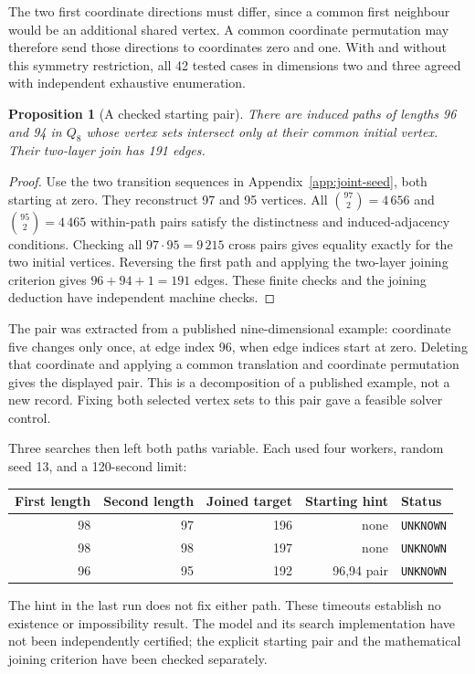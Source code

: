 \documentclass[11pt,a4paper]{article}
\newtheorem{proposition}[theorem]{Proposition}
\theoremstyle{definition}
\theoremstyle{remark}
\newcommand{\Q}{Q}
\begin{document}
The two first coordinate directions must differ, since a common first neighbour would be an additional shared vertex. A common coordinate permutation may therefore send those directions to coordinates zero and one. With and without this symmetry restriction, all 42 tested cases in dimensions two and three agreed with independent exhaustive enumeration.

\begin{proposition}[A checked starting pair]\label{prop:joint-seed}
There are induced paths of lengths 96 and 94 in $\Q_8$ whose vertex sets intersect only at their common initial vertex. Their two-layer join has 191 edges.
\end{proposition}
\begin{proof}
Use the two transition sequences in Appendix~\ref{app:joint-seed}, both starting at zero. They reconstruct 97 and 95 vertices. All $\binom{97}{2}=4\,656$ and $\binom{95}{2}=4\,465$ within-path pairs satisfy the distinctness and induced-adjacency conditions. Checking all $97\cdot95=9\,215$ cross pairs gives equality exactly for the two initial vertices. Reversing the first path and applying the two-layer joining criterion gives $96+94+1=191$ edges. These finite checks and the joining deduction have independent machine checks.
\end{proof}

The pair was extracted from a published nine-dimensional example: coordinate five changes only once, at edge index 96, when edge indices start at zero. Deleting that coordinate and applying a common translation and coordinate permutation gives the displayed pair. This is a decomposition of a published example, not a new record. Fixing both selected vertex sets to this pair gave a feasible solver control.

Three searches then left both paths variable. Each used four workers, random seed 13, and a 120-second limit:
\begin{center}
\begin{tabular}{rrrrl}
\toprule
First length & Second length & Joined target & Starting hint & Status\\
\midrule
98 & 97 & 196 & none & \texttt{UNKNOWN}\\
98 & 98 & 197 & none & \texttt{UNKNOWN}\\
96 & 95 & 192 & 96,94 pair & \texttt{UNKNOWN}\\
\bottomrule
\end{tabular}
\end{center}
The hint in the last run does not fix either path. These timeouts establish no existence or impossibility result. The model and its search implementation have not been independently certified; the explicit starting pair and the mathematical joining criterion have been checked separately.
\end{document}
